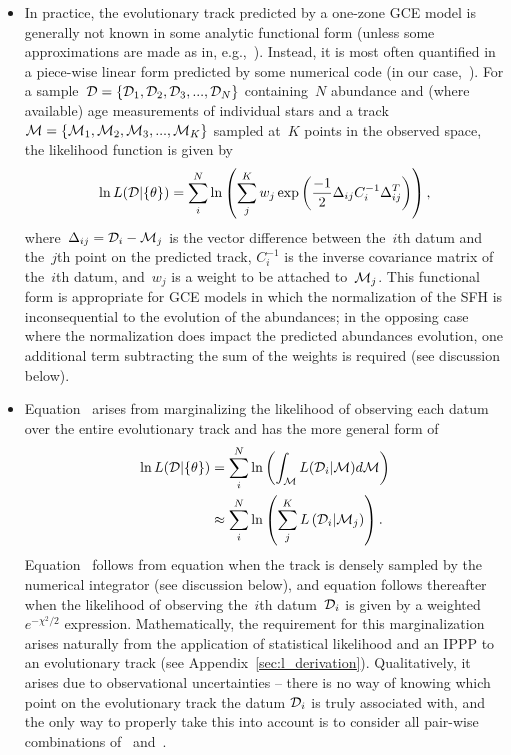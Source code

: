 \documentclass[ms.tex]{subfiles}
\begin{document}
\begin{itemize}
	\item In practice, the evolutionary track predicted by a one-zone GCE model
	is generally not known in some analytic functional form (unless some
	approximations are made as in, e.g.,~\citealp{Weinberg2017}).
	Instead, it is most often quantified in a piece-wise linear form predicted
	by some numerical code (in our case,~\vice).
	For a sample~$\mathcal{D} = \{\mathcal{D}_1, \mathcal{D}_2, \mathcal{D}_3,
	..., \mathcal{D}_N\}$ containing~$N$ abundance and (where available) age
	measurements of individual stars and a track~$\mathcal{M} = \{\mathcal{M}_1,
	\mathcal{M}_2, \mathcal{M}_3, ..., \mathcal{M}_K\}$ sampled at~$K$ points in
	the observed space, the likelihood function is given by
	\begin{equation}
	\ln L(\mathcal{D} | \{\theta\}) = \sum_i^N \ln \left(
	\sum_j^K w_j \exp \left(
	\frac{-1}{2} \Delta_{ij} C_i^{-1} \Delta_{ij}^T
	\right)
	\right),
	\label{eq:likelihood}
	\end{equation}
	where~$\Delta_{ij} = \mathcal{D}_i - \mathcal{M}_j$ is the vector difference
	between the~$i$th datum and the~$j$th point on the predicted track,
	$C_i^{-1}$ is the inverse covariance matrix of the~$i$th datum, and~$w_j$
	is a weight to be attached to~$\mathcal{M}_j$.
	This functional form is appropriate for GCE models in which the
	normalization of the SFH is inconsequential to the evolution of the
	abundances; in the opposing case where the normalization does impact the
	predicted abundances evolution, one additional term subtracting the sum of
	the weights is required (see discussion below).

	\item Equation~ arises from marginalizing the
	likelihood of observing each datum over the entire evolutionary track and
	has the more general form of
	\begin{subequations}\begin{align}
	\ln L(\mathcal{D} | \{\theta\}) &= \sum_i^N \ln \left(
	\int_{\mathcal{M}} L(\mathcal{D}_i | \mathcal{M}) d\mathcal{M}
	\right)
	\label{eq:likelihood_general_integral}
	\\
	&\approx \sum_i^N \ln \left(
	\sum_j^K L\left(\mathcal{D}_i | \mathcal{M}_j
	\right)\right).
	\label{eq:likelihood_general}
	\end{align}\end{subequations}
	Equation~ follows from equation
	 when the track is densely sampled by
	the numerical integrator (see discussion below), and equation
	 follows thereafter when the likelihood of observing
	the~$i$th datum~$\mathcal{D}_i$ is given by a weighted~$e^{-\chi^2/2}$
	expression.
	Mathematically, the requirement for this marginalization arises naturally
	from the application of statistical likelihood and an IPPP to an
	evolutionary track (see Appendix~\ref{sec:l_derivation}).
	Qualitatively, it arises due to observational uncertainties -- there is no
	way of knowing which point on the evolutionary track the datum
	$\mathcal{D}_i$ is truly associated with, and the only way to properly take
	this into account is to consider all pair-wise combinations of~
	and~.


\end{itemize}
\end{document}
